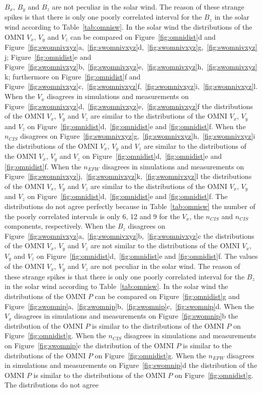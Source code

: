 \documentclass[linenumbers,draft]{agujournal}
\begin{document}
$B_{x}$, $B_{y}$ and $B_{z}$ are not peculiar in the solar wind. The reason of these strange spikes is that there is only one poorly correlated interval for the $B_{z}$ in the solar wind according to Table~\ref{tab:omnisw}. In the solar wind the distributions of the OMNI $V_{x}$, $V_{y}$ and $V_{z}$ can be compared on Figure~\ref{fig:omnidist}d and Figure~\ref{fig:swomnivxyz}a,~\ref{fig:swomnivxyz}d,~\ref{fig:swomnivxyz}g,~\ref{fig:swomnivxyz}j; Figure~\ref{fig:omnidist}e and Figure~\ref{fig:swomnivxyz}b,~\ref{fig:swomnivxyz}e,~\ref{fig:swomnivxyz}h,~\ref{fig:swomnivxyz}k; furthermore on Figure~\ref{fig:omnidist}f and Figure~\ref{fig:swomnivxyz}c,~\ref{fig:swomnivxyz}f,~\ref{fig:swomnivxyz}i,~\ref{fig:swomnivxyz}l. When the $V_{x}$ disagrees in simulations and measurements on Figure~\ref{fig:swomnivxyz}d,~\ref{fig:swomnivxyz}e,~\ref{fig:swomnivxyz}f the distributions of the OMNI $V_{x}$, $V_{y}$ and $V_{z}$ are similar to the distributions of the OMNI $V_{x}$, $V_{y}$ and $V_{z}$ on Figure~\ref{fig:omnidist}d,~\ref{fig:omnidist}e and \ref{fig:omnidist}f. When the $n_{CIS}$ disagrees on Figure~\ref{fig:swomnivxyz}g,~\ref{fig:swomnivxyz}h,~\ref{fig:swomnivxyz}i the distributions of the OMNI $V_{x}$, $V_{y}$ and $V_{z}$ are similar to the distributions of the OMNI $V_{x}$, $V_{y}$ and $V_{z}$ on Figure~\ref{fig:omnidist}d,~\ref{fig:omnidist}e and \ref{fig:omnidist}f. When the $n_{EFW}$ disagrees in simulations and measurements on Figure~\ref{fig:swomnivxyz}j,~\ref{fig:swomnivxyz}k,~\ref{fig:swomnivxyz}l the distributions of the OMNI $V_{x}$, $V_{y}$ and $V_{z}$ are similar to the distributions of the OMNI $V_{x}$, $V_{y}$ and $V_{z}$ on Figure~\ref{fig:omnidist}d,~\ref{fig:omnidist}e and \ref{fig:omnidist}f. The distributions do not agree perfectly because in Table~\ref{tab:omnisw} the number of the poorly correlated intervals is only 6, 12 and 9 for the $V_{x}$, the $n_{CIS}$ and $n_{CIS}$ components, respectively. When the $B_{z}$ disagrees on Figure~\ref{fig:swomnivxyz}a,~\ref{fig:swomnivxyz}b,~\ref{fig:swomnivxyz}c the distributions of the OMNI $V_{x}$, $V_{y}$ and $V_{z}$ are not similar to the distributions of the OMNI $V_{x}$, $V_{y}$ and $V_{z}$ on Figure~\ref{fig:omnidist}d,~\ref{fig:omnidist}e and \ref{fig:omnidist}f. The values of the OMNI $V_{x}$, $V_{y}$ and $V_{z}$ are not peculiar in the solar wind. The reason of these strange spikes is that there is only one poorly correlated interval for the $B_{z}$ in the solar wind according to Table~\ref{tab:omnisw}. In the solar wind the distributions of the OMNI $P$ can be compared on Figure~\ref{fig:omnidist}g and Figure~\ref{fig:swomnip}a,~\ref{fig:swomnip}b,~\ref{fig:swomnip}c,~\ref{fig:swomnip}d. When the $V_{x}$ disagrees in simulations and measurements on Figure~\ref{fig:swomnip}b the distribution of the OMNI $P$ is similar to the distributions of the OMNI $P$ on Figure~\ref{fig:omnidist}g. When the $n_{CIS}$ disagrees in simulations and measurements on Figure~\ref{fig:swomnip}c the distribution of the OMNI $P$ is similar to the distributions of the OMNI $P$ on Figure~\ref{fig:omnidist}g. When the $n_{EFW}$ disagrees in simulations and measurements on Figure~\ref{fig:swomnip}d the distribution of the OMNI $P$ is similar to the distributions of the OMNI $P$ on Figure~\ref{fig:omnidist}g. The distributions do not agree 
\end{document}
